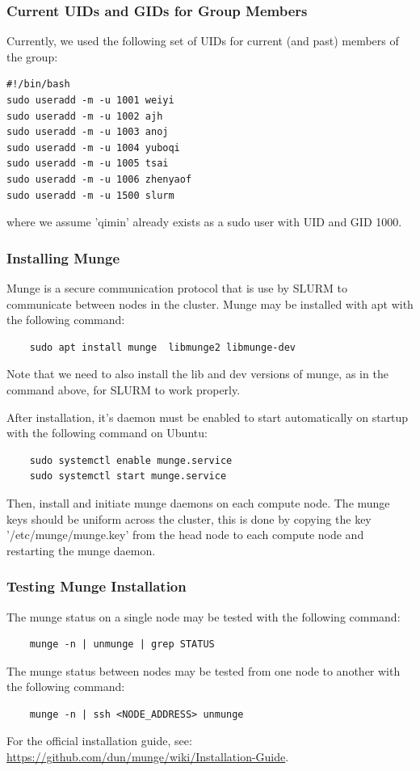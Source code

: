 \documentclass[]{article}
\begin{document}
\subsubsection*{Current UIDs and GIDs for Group Members}
Currently, we used the following set of UIDs for current (and past) members of the group:
\begin{verbatim}
#!/bin/bash
sudo useradd -m -u 1001 weiyi
sudo useradd -m -u 1002 ajh
sudo useradd -m -u 1003 anoj
sudo useradd -m -u 1004 yuboqi
sudo useradd -m -u 1005 tsai
sudo useradd -m -u 1006 zhenyaof
sudo useradd -m -u 1500 slurm
\end{verbatim}
where we assume 'qimin' already exists as a sudo user with UID and GID 1000.

\subsubsection{Installing Munge}
Munge is a secure communication protocol that is use by SLURM to communicate between nodes in the cluster. 
Munge may be installed with apt with the following command:
\begin{verbatim}
	sudo apt install munge  libmunge2 libmunge-dev
\end{verbatim}
Note that we need to also install the lib and dev versions of munge, as in the command above, for SLURM to work properly.
 
After installation, it's daemon must be enabled to start automatically on startup with the following command on Ubuntu:


\begin{verbatim}
	sudo systemctl enable munge.service
	sudo systemctl start munge.service
\end{verbatim}
Then, install and initiate munge daemons on each compute node. The munge keys should be uniform across the cluster, this is done by copying the key '/etc/munge/munge.key' from the head node to each compute node and restarting the munge daemon.


\subsubsection*{Testing Munge Installation}
The munge status on a single node may be tested with the following command:
\begin{verbatim}
	munge -n | unmunge | grep STATUS
\end{verbatim}
The munge status between nodes may be tested from one node to another with the following command:
\begin{verbatim}
	munge -n | ssh <NODE_ADDRESS> unmunge
\end{verbatim}
For the official installation guide, see: \url{https://github.com/dun/munge/wiki/Installation-Guide}.
\end{document}
